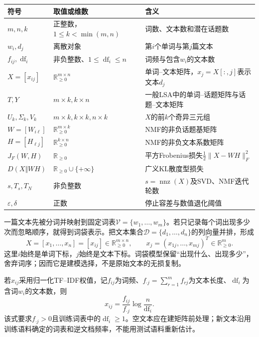 \begin{symboltablebox}
\small
\begin{tabularx}{\linewidth}{@{}l l X@{}}
\toprule 符号 & 取值或维数 & 含义\\ \midrule
$m,n,k$ & 正整数，$1\le k<\min(m,n)$ & 词数、文本数和潜在话题数\\
$w_i,d_j$ & 离散对象 & 第$i$个单词与第$j$篇文本\\
$f_{ij},\operatorname{df}_i$ & 非负整数、$1\le\operatorname{df}_i\le n$ & 词频与包含$w_i$的文本数\\
$X=[x_{ij}]$ & $\mathbb R_{\ge0}^{m\times n}$ & 单词--文本矩阵，$x_j=X[:,j]$表示文本$d_j$\\
$T,Y$ & $m\times k,k\times n$ & 一般LSA中的单词--话题矩阵与话题--文本矩阵\\
$U_k,\Sigma_k,V_k$ & $m\times k,k\times k,n\times k$ & $X$的前$k$个奇异三元组\\
$W=[W_{i\ell}]$ & $\mathbb R_{\ge0}^{m\times k}$ & NMF的非负话题基矩阵\\
$H=[H_{\ell j}]$ & $\mathbb R_{\ge0}^{k\times n}$ & NMF的非负文本系数矩阵\\
$J_F(W,H)$ & $\mathbb R_{\ge0}$ & 平方Frobenius损失$\frac12\|X-WH\|_F^2$\\
$D(X\Vert WH)$ & $\mathbb R_{\ge0}\cup\{+\infty\}$ & 广义KL散度型损失\\
$s,T_s,T_N$ & 非负整数 & $s=\operatorname{nnz}(X)$及SVD、NMF迭代轮数\\
$\varepsilon,\delta$ & 正数 & 停止容差与数值退化阈值\\
\bottomrule
\end{tabularx}
\end{symboltablebox}

\label{struct:V4-C05-CH06}
一篇文本先被分词并映射到固定词表$\mathcal V=\{w_1,\ldots,w_m\}$。若只记录每个词出现多少次而忽略顺序，就得到词袋表示。把文本集合$\mathcal D=\{d_1,\ldots,d_n\}$的列向量并排，形成
\[
X=[x_1,\ldots,x_n]=[x_{ij}]\in\mathbb R_{\ge0}^{m\times n},
\qquad x_j=(x_{1j},\ldots,x_{mj})^T\in\mathbb R_{
\ge0}^{m}.
\]
这里$i$始终是单词下标，$j$始终是文本下标。词袋模型保留“出现什么、出现多少”，舍弃词序；因而它是建模选择，不是原始文本的无损复制。

若$x_{ij}$采用归一化TF--IDF权值，记$f_{ij}$为词频、$f_{\cdot j}=\sum_{r=1}^mf_{rj}$为文本长度、$\operatorname{df}_i$为含词$w_i$的文本数，则
\[
x_{ij}=\frac{f_{ij}}{f_{\cdot j}}
\log\frac{n}{\operatorname{df}_i}.
\]
该式要求$f_{\cdot j}>0$且训练词表中的$\operatorname{df}_i\ge1$。空文本应在建矩阵前处理；新文本沿用训练语料确定的词表和逆文档频率，不能用测试语料重新估计。

